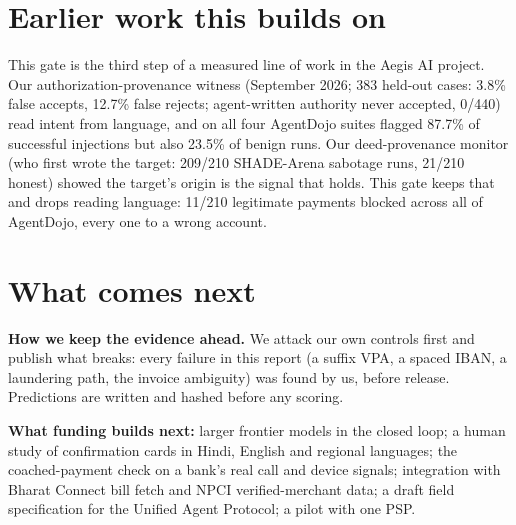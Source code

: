 \documentclass[10pt,a4paper]{article}
\begin{document}
\section{Earlier work this builds on}\label{sec:lineage}

This gate is the third step of a measured line of work in the Aegis AI project. Our authorization-provenance witness
(September 2026; 383 held-out cases: 3.8\% false accepts, 12.7\% false rejects; agent-written authority never accepted,
0/440) read intent from language, and on all four AgentDojo suites flagged 87.7\% of successful injections but also 23.5\%
of benign runs. Our deed-provenance monitor (who first wrote the target: 209/210 SHADE-Arena sabotage runs, 21/210 honest)
showed the target's origin is the signal that holds. This gate keeps that and drops reading language: 11/210 legitimate
payments blocked across all of AgentDojo, every one to a wrong account.

\section{What comes next}
\textbf{How we keep the evidence ahead.} We attack our own controls first and publish what breaks: every failure in this
report (a suffix VPA, a spaced IBAN, a laundering path, the invoice ambiguity) was found by us, before release.
Predictions are written and hashed before any scoring.

\textbf{What funding builds next:} larger frontier models in the closed loop; a human study of confirmation cards in
Hindi, English and regional languages; the coached-payment check on a bank's real call and device signals;
integration with Bharat Connect bill fetch and NPCI verified-merchant data; a draft field specification for the Unified
Agent Protocol; a pilot with one PSP.
\end{document}
